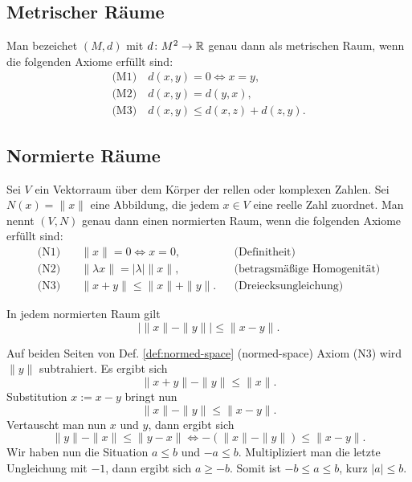 \subsection{Metrischer Räume}
\begin{Definition}
Man bezeichet $(M,d)$ mit $d\colon M^2\to\mathbb R$ genau dann als
metrischen Raum, wenn die folgenden Axiome erfüllt sind:
\begin{gather*}
\text{(M1)}\quad d(x,y)=0\iff x=y,\\
\text{(M2)}\quad d(x,y)=d(y,x),\\
\text{(M3)}\quad d(x,y)\le d(x,z)+d(z,y).
\end{gather*}
\end{Definition}

\subsection{Normierte Räume}
\begin{Definition}\label{def:normed-space}
Sei $V$ ein Vektorraum über dem Körper der rellen oder komplexen
Zahlen. Sei $N(x)=\|x\|$ eine Abbildung, die jedem $x\in V$ eine
reelle Zahl zuordnet. Man nennt $(V,N)$ genau dann einen
normierten Raum, wenn die folgenden Axiome erfüllt sind:
\begin{align*}
\text{(N1)}\quad &\|x\|=0\iff x=0,&&\text{(Definitheit)}\\
\text{(N2)}\quad &\|\lambda x\|=|\lambda|\|x\|,&&\text{(betragsmäßige Homogenität)}\\
\text{(N3)}\quad &\|x+y\| \le \|x\|+\|y\|.&&\text{(Dreiecksungleichung)}
\end{align*}
\end{Definition}

\begin{Satz}\label{rev-tineq}
In jedem normierten Raum gilt
\[|\|x\|-\|y\|| \le \|x-y\|.\]
\end{Satz}
\begin{Beweis}
Auf beiden Seiten von Def. \ref{def:normed-space} (normed-space)
Axiom (N3) wird $\|y\|$ subtrahiert.
Es ergibt sich
\[\|x+y\| - \|y\| \le \|x\|.\]
Substitution $x:=x-y$ bringt nun
\[\|x\| - \|y\| \le \|x-y\|.\]
Vertauscht man nun $x$ und $y$, dann ergibt sich
\[\|y\|-\|x\| \le \|y-x\| \iff -(\|x\|-\|y\|)\le \|x-y\|.\]
Wir haben nun die Situation $a\le b$ und $-a\le b$. Multipliziert
man die letzte Ungleichung mit $-1$, dann ergibt sich $a\ge -b$.
Somit ist $-b\le a\le b$, kurz $|a|\le b$.\,\qedsymbol
\end{Beweis}


